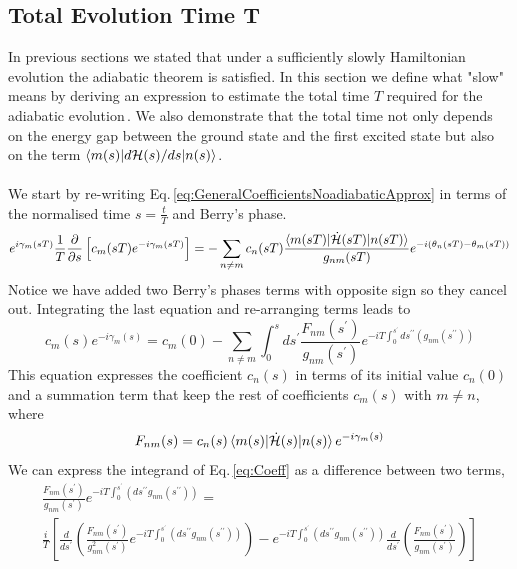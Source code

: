 \subsection{Total Evolution Time T}
In previous sections we stated that under a sufficiently slowly Hamiltonian evolution the adiabatic theorem is satisfied. In this section we define what "slow" means by deriving an expression to estimate the total time $T$ required for the adiabatic evolution\,\cite{Sarandy2005AdiabaticSystems}. We also demonstrate that the total time not only depends on the energy gap between the ground state and the first excited state but also on the term $\braket{m(s)|d\mathcal{H}(s)/ds|n(s)}$.\\\\
We start by re-writing Eq.\,\eqref{eq:GeneralCoefficientsNoadiabaticApprox} in terms of the normalised time $s = \frac{t}{T}$ and Berry's phase.
\begin{equation}
    e^{i\gamma_{m}(sT)}\frac{1}{T}\frac{\partial }{\partial s}\left[c_{m}(sT)e^{-i\gamma_{m}(sT)}\right] = -\sum_{n\neq m} c_{n}(sT) \frac{\braket{m(sT)|\dot{\mathcal{H}}(sT)|n(sT)}}{g_{nm}(sT)}e^{-i\left(\theta_{n}(sT) - \theta_{m}(sT)\right)}
\end{equation}
Notice we have added two Berry's phases terms with opposite sign so they cancel out. Integrating the last equation and re-arranging terms leads to
\begin{equation}
\label{eq:Coeff}
    c_{m}(s)e^{-i\gamma_{m}(s)} = c_{m}(0) - \sum_{n\neq m}\int_{0}^{s} ds^{\prime}\frac{F_{nm}(s^{\prime})}{g_{nm}(s^{\prime})}e^{-iT\int_{0}^{s^{\prime}}ds^{\prime\prime}\left(g_{nm}(s^{\prime\prime})\right)}
\end{equation}
This equation expresses the coefficient $c_{n}(s)$ in terms of its initial value $c_{n}(0)$ and a summation term that keep the rest of coefficients $c_{m}(s)$ with $m\neq n$, where
\begin{equation}
\label{eq:Fnm}
    F_{nm}(s) = c_{n}(s)\braket{m(s)|\dot{\mathcal{H}}(s)|n(s)} e^{-i\gamma_{m}(s)}
\end{equation}
We can express the integrand of Eq.\,\eqref{eq:Coeff} as a difference between two terms,
\begin{align}
\frac{F_{nm}(s^{\prime})}{g_{nm}(s^{\prime})} e^{-iT\int_{0}^{s^{\prime}}\left(ds^{\prime \prime}g_{nm}(s^{\prime\prime}) \right)}= \\
\frac{i}{T}\left[\frac{d}{ds^{\prime}}\left(\frac{F_{nm}(s^{\prime})}{g^{2}_{nm}(s^{\prime})}e^{-iT\int_{0}^{s^{\prime}}\left(ds^{\prime \prime}g_{nm}(s^{\prime\prime}) \right)}\right) - e^{-iT\int_{0}^{s^{\prime}}\left(ds^{\prime \prime}g_{nm}(s^{\prime\prime}) \right)} \frac{d}{ds^{\prime}}\left(\frac{F_{nm}(s^{\prime})}{g_{nm}(s^{\prime})}\right)\right] 
 \end{align}
